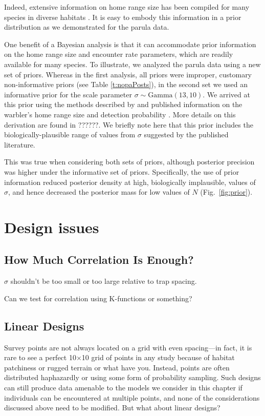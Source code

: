 Indeed, extensive information on home range size has
been compiled for many species in diverse habitats %
\citep[\emph{e.g.},][]{degraaf_yamasaki:2001}. It is
easy to embody this information in a prior distribution as we
demonstrated for the parula data.


One benefit of a Bayesian analysis is that it can accommodate prior
information on the home range size and encounter rate parameters,
which are readily available for many
species. To illustrate, we analyzed the parula data using a new set of
priors. Whereas in the first analysis, all priors were
improper, customary non-informative priors (see Table \ref{t:nopaPosts}),
in the second set we used
an informative prior for the scale parameter $\sigma \sim
\mbox{Gamma}(13,10)$. We arrived at this prior using the methods
described by \citet{royle_etal:2011mee} and published
information on the warbler's home range size and detection probability
\citep{moldenhaer_regelski:1996,simons_etal:2009}. More details on this
derivation are found in ??????. We briefly note here that this prior
includes the biologically-plausible range of values from $\sigma$
suggested by the published literature.


This was true when
considering
both sets of priors, although posterior precision was higher under the
informative set of priors. Specifically, the use of prior information
reduced posterior density at high, biologically implausible,
values of $\sigma$, and hence decreased the posterior mass for
low values of $N$ (Fig.~\ref{fig:prior}).


\section{Design issues}

\subsection{How Much Correlation Is Enough?}

$\sigma$ shouldn't be too small or too large relative to trap spacing.

Can we test for correlation using K-functions or something?

\subsection{Linear Designs}

Survey points are not always located on a grid with even spacing---in
fact, it is rare to see a perfect 10$\times$10 grid of points in any
study because of habitat patchiness or rugged terrain or what have
you. Instead, points are often distributed haphazardly or using some form of
probability sampling. Such designs can still produce data amenable to
the models we consider in this chapter if individuals can be
encountered at multiple points, and none of the considerations
discussed above need to be modified. But what about linear designs?

